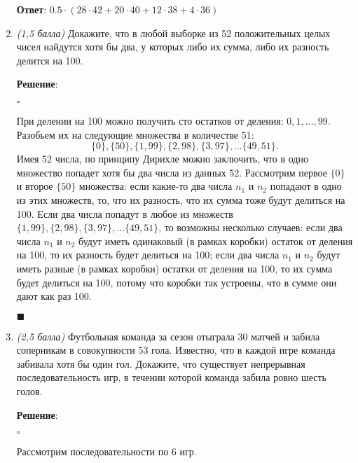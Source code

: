 \documentclass{article}
\begin{document}
\begin{enumerate}
        \textbf{Ответ}:
        $0.5\cdot(28\cdot42+20\cdot40+12\cdot38+4\cdot36)$

        \item \textit{(1,5 балла)} Докажите, что в любой выборке из 52 положительных целых чисел найдутся хотя бы два, у которых либо их сумма, либо их разность делится на 100.
        
        \textbf{Решение}:

        $\square$

        При делении на 100 можно получить сто остатков от деления: $0, 1, \ldots, 99$. Разобьем их на следующие множества в количестве 51:
        $$\{0\}, \{50\}, \{1, 99\}, \{2, 98\}, \{3, 97\}, \ldots \{49, 51\}.$$
        Имея 52 числа, по принципу Дирихле можно заключить, что в одно множество попадет хотя бы два числа из данных 52. Рассмотрим первое $\{0\}$ и второе $\{50\}$ множества: если какие-то два числа $n_1$ и $n_2$ попадают в одно из этих множеств, то, что их разность, что их сумма тоже будут делиться на 100. Если два числа попадут в любое из множеств $\{1, 99\}, \{2, 98\}, \{3, 97\}, \ldots \{49, 51\}$, то возможны несколько случаев: если два числа $n_1$ и $n_2$ будут иметь одинаковый (в рамках коробки) остаток от деления на 100, то их разность будет делиться на 100; если два числа $n_1$ и $n_2$ будут иметь разные (в рамках коробки) остатки от деления на 100, то их сумма будет делиться на 100, потому что коробки так устроены, что в сумме они дают как раз 100.
        \begin{flushright}
            $\blacksquare$
        \end{flushright}

        \item \textit{(2,5 балла)} Футбольная команда за сезон отыграла 30 матчей и забила соперникам в совокупности 53 гола. Известно, что в каждой игре команда забивала хотя бы один гол. Докажите, что существует непрерывная последовательность игр, в течении которой команда забила ровно шесть голов.
        
        \textbf{Решение}:

        $\square$

        Рассмотрим последовательности по 6 игр.
        \begin{center}
    

\end{center}
\end{enumerate}
\end{document}
